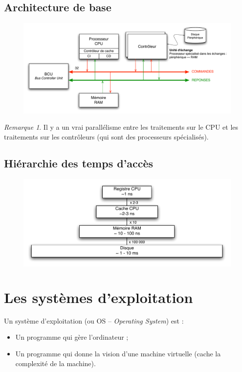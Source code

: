 \documentclass[11pt,english,french]{scrreprt}
\theoremstyle{remark}
\newtheorem*{rem*}{Remarque}
\theoremstyle{definition}
\begin{document}
\subsection{Architecture de base} %

\begin{figure}[h!]
	\center
	\includegraphics[scale=.6]{img/architecture}
\end{figure}

\begin{rem*}
	Il y a un vrai parallélisme entre les traitements sur le CPU et les traitements sur les contrôleurs (qui sont des processeurs spécialisés).
\end{rem*}

\subsection{Hiérarchie des temps d'accès} %
\begin{figure}[h!]
	\center
	\includegraphics[scale=.75]{img/hierarchie-memoire}
\end{figure}

\clearpage

\section{Les systèmes d'exploitation} %

Un système d'exploitation (ou OS -- \emph{Operating System}) est :\begin{itemize}
	\item Un programme qui gère l'ordinateur ;
	\item Un programme qui donne la vision d'une machine virtuelle (cache la complexité de la machine).
\end{itemize}
\end{document}
